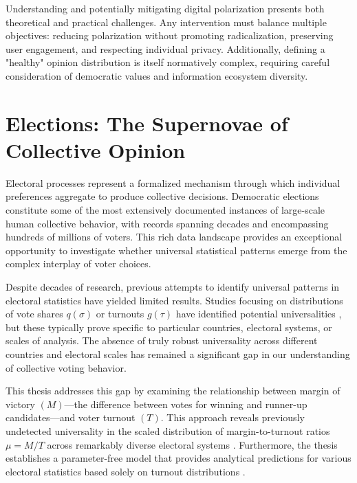 Understanding and potentially mitigating digital polarization presents both theoretical and practical challenges. Any intervention must balance multiple objectives: reducing polarization without promoting radicalization, preserving user engagement, and respecting individual privacy. Additionally, defining a "healthy" opinion distribution is itself normatively complex, requiring careful consideration of democratic values and information ecosystem diversity.

\section{Elections: The Supernovae of Collective Opinion}

Electoral processes represent a formalized mechanism through which individual preferences aggregate to produce collective decisions. Democratic elections constitute some of the most extensively documented instances of large-scale human collective behavior, with records spanning decades and encompassing hundreds of millions of voters. This rich data landscape provides an exceptional opportunity to investigate whether universal statistical patterns emerge from the complex interplay of voter choices.

Despite decades of research, previous attempts to identify universal patterns in electoral statistics have yielded limited results. Studies focusing on distributions of vote shares $q(\sigma)$ or turnouts $g(\tau)$ have identified potential universalities \cite{voting-contagion-modeling-and-analysis-of-a-century, scaling-and-universality-in-proportional-elections}, but these typically prove specific to particular countries, electoral systems, or scales of analysis. The absence of truly robust universality across different countries and electoral scales has remained a significant gap in our understanding of collective voting behavior.

This thesis addresses this gap by examining the relationship between margin of victory $(M)$—the difference between votes for winning and runner-up candidates—and voter turnout $(T)$. This approach reveals previously undetected universality in the scaled distribution of margin-to-turnout ratios $\mu = M/T$ across remarkably diverse electoral systems \cite{universal-statistics-of-competition}. Furthermore, the thesis establishes a parameter-free model that provides analytical predictions for various electoral statistics based solely on turnout distributions \cite{voter-turnouts-govern-key-electoral-statistics}.


